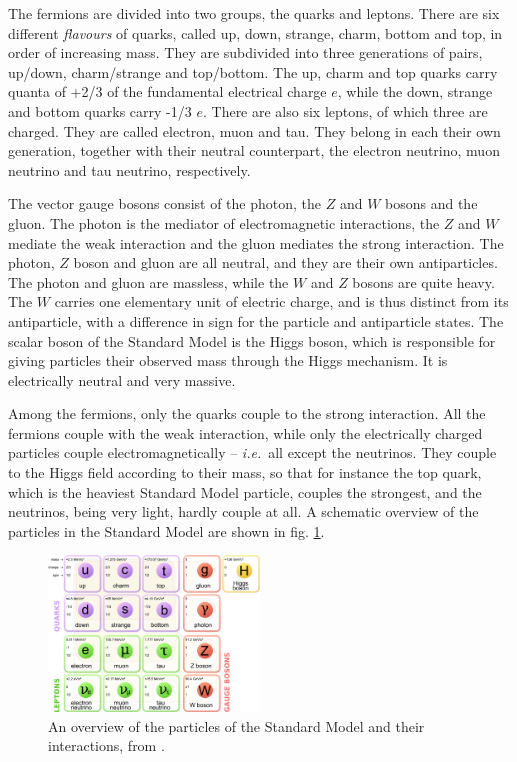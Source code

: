\documentclass[twoside,english]{uiofysmaster}
\begin{document}
The fermions are divided into two groups, the quarks and leptons. There are six different {\it flavours} of quarks, called up, down, strange, charm, bottom and top, in order of increasing mass. They are subdivided into three generations of pairs, up/down, charm/strange and top/bottom. The up, charm and top quarks carry quanta of +2/3 of the fundamental electrical charge $e$, while the down, strange and bottom quarks carry -1/3 $e$. There are also six leptons, of which three are charged. They are called electron, muon and tau. They belong in each their own generation, together with their neutral counterpart, the electron neutrino, muon neutrino and tau neutrino, respectively. 

The vector gauge bosons consist of the photon, the $Z$ and $W$ bosons and the gluon. The photon is the mediator of electromagnetic interactions, the $Z$ and $W$ mediate the weak interaction and the gluon mediates the strong interaction. The photon, $Z$ boson and gluon are all neutral, and they are their own antiparticles. The photon and gluon are massless, while the $W$ and $Z$ bosons are quite heavy. The $W$ carries one elementary unit of electric charge, and is thus distinct from its antiparticle, with a difference in sign for the particle and antiparticle states. The scalar boson of the Standard Model is the Higgs boson, which is responsible for giving particles their observed mass through the Higgs mechanism. It is electrically neutral and very massive.

Among the fermions, only the quarks couple to the strong interaction. All the fermions couple with the weak interaction, while only the electrically charged particles couple electromagnetically -- {\it i.e.}\ all except the neutrinos. They couple to the Higgs field according to their mass, so that for instance the top quark, which is the heaviest Standard Model particle, couples the strongest, and the neutrinos, being very light, hardly couple at all. A schematic overview of the particles in the Standard Model are shown in fig. \ref{fig:SM_particles}.
\begin{figure}[hbt]
	\centering
	\includegraphics[width=0.5\textwidth]{figures/susyintro/Standard_Model_of_Elementary_Particles.pdf}
	\caption{An overview of the particles of the Standard Model and their interactions, from \cite{Wikimedia_SM_particles}.}
	\label{fig:SM_particles}
\end{figure}
\end{document}
